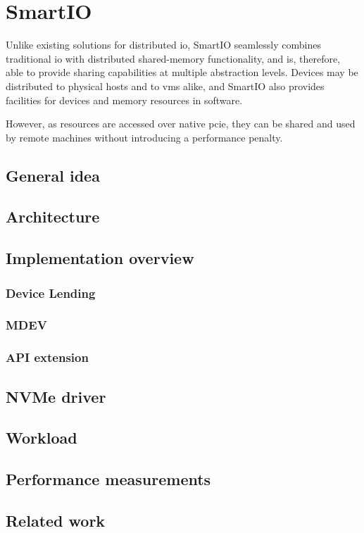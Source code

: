 \chapter{SmartIO}\label{sec:smartio}

Unlike existing solutions for distributed \gls{io}, SmartIO seamlessly combines traditional \gls{io} with distributed shared-memory functionality, and is, therefore, able to provide sharing capabilities at multiple abstraction levels.
Devices may be distributed to physical hosts and to \glspl{vm} alike, and SmartIO also provides facilities for  devices and memory resources in software.


However, as resources are accessed over native \gls{pcie}, they can be shared and used by remote machines without introducing a performance penalty.
\section{General idea}
\section{Architecture}

\section{Implementation overview}
\subsection{Device Lending}
\subsection{MDEV}
\subsection{API extension}

\section{NVMe driver}

\section{Workload}

\section{Performance measurements}

\section{Related work}\label{sec:rw}
